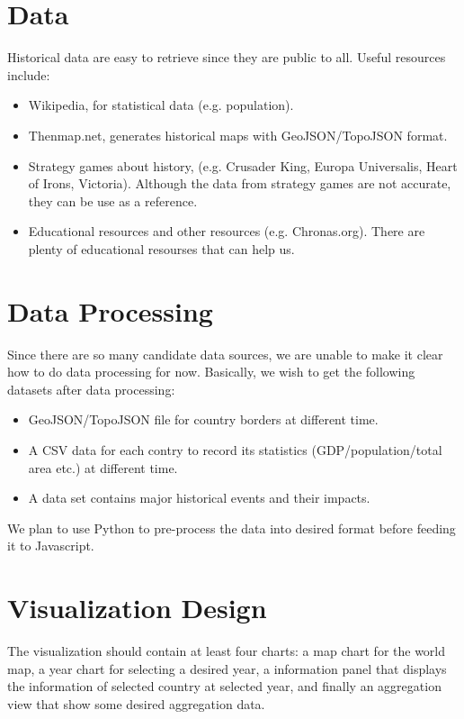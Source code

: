\documentclass[12pt, fullpage,letterpaper]{article}
\begin{document}
\section{Data}
Historical data are easy to retrieve since they are public to all. Useful resources include:
\begin{itemize}
    \item Wikipedia, for statistical data (e.g. population).
    \item Thenmap.net, generates historical maps with GeoJSON/TopoJSON format.
    \item Strategy games about history, (e.g. Crusader King, Europa Universalis, Heart of Irons, Victoria). Although the data from strategy games are not accurate, they can be use
        as a reference.
    \item Educational resources and other resources (e.g. Chronas.org). There are plenty of educational resourses that can help us.
\end{itemize}

\section{Data Processing}
Since there are so many candidate data sources, we are unable to make it clear how to do data processing for now.
Basically, we wish to get the following datasets after data processing:
\begin{itemize}
    \item GeoJSON/TopoJSON file for country borders at different time.
    \item A CSV data for each contry to record its statistics (GDP/population/total area etc.) at different time.
    \item A data set contains major historical events and their impacts.
\end{itemize}

We plan to use Python to pre-process the data into desired format before feeding it to Javascript.

\section{Visualization Design}

The visualization should contain at least four charts: a map chart for the world map, a year chart for selecting a desired year, a information panel that displays the information
of selected country at selected year, and finally an aggregation view that show some desired aggregation data.
\end{document}
